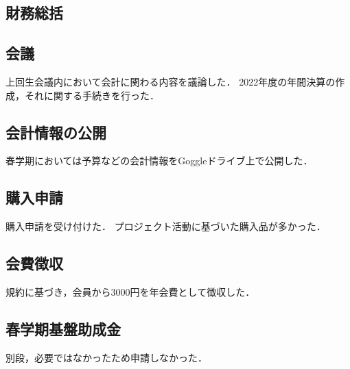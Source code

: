 \subsection*{財務総括}


\subsection*{会議}
上回生会議内において会計に関わる内容を議論した．
2022年度の年間決算の作成，それに関する手続きを行った．

\subsection*{会計情報の公開}
春学期においては予算などの会計情報をGoggleドライブ上で公開した．

\subsection*{購入申請}
購入申請を受け付けた．
プロジェクト活動に基づいた購入品が多かった．


\subsection*{会費徴収}
規約に基づき，会員から3000円を年会費として徴収した．

\subsection*{春学期基盤助成金}
別段，必要ではなかったため申請しなかった．

